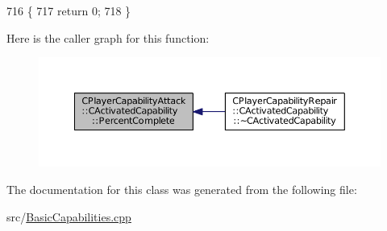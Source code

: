 \begin{DoxyCode}
716                                                                        \{
717     \textcolor{keywordflow}{return} 0;
718 \}
\end{DoxyCode}
Here is the caller graph for this function\+:
\nopagebreak
\begin{figure}[H]
\begin{center}
\leavevmode
\includegraphics[width=350pt]{classCPlayerCapabilityAttack_1_1CActivatedCapability_a75866109b62de0522622b03137461519_icgraph}
\end{center}
\end{figure}


The documentation for this class was generated from the following file\+:\begin{DoxyCompactItemize}
\item 
src/\hyperlink{BasicCapabilities_8cpp}{Basic\+Capabilities.\+cpp}\end{DoxyCompactItemize}
